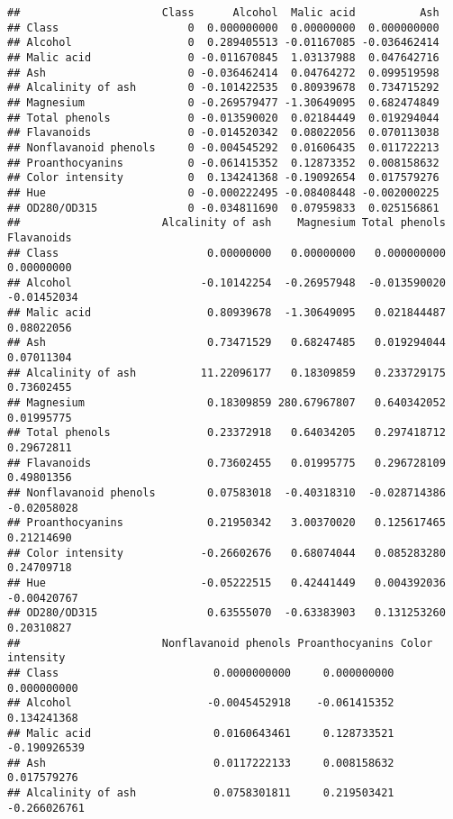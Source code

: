 \documentclass[
]{article}
\begin{document}
\begin{verbatim}
##                      Class      Alcohol  Malic acid          Ash
## Class                    0  0.000000000  0.00000000  0.000000000
## Alcohol                  0  0.289405513 -0.01167085 -0.036462414
## Malic acid               0 -0.011670845  1.03137988  0.047642716
## Ash                      0 -0.036462414  0.04764272  0.099519598
## Alcalinity of ash        0 -0.101422535  0.80939678  0.734715292
## Magnesium                0 -0.269579477 -1.30649095  0.682474849
## Total phenols            0 -0.013590020  0.02184449  0.019294044
## Flavanoids               0 -0.014520342  0.08022056  0.070113038
## Nonflavanoid phenols     0 -0.004545292  0.01606435  0.011722213
## Proanthocyanins          0 -0.061415352  0.12873352  0.008158632
## Color intensity          0  0.134241368 -0.19092654  0.017579276
## Hue                      0 -0.000222495 -0.08408448 -0.002000225
## OD280/OD315              0 -0.034811690  0.07959833  0.025156861
##                      Alcalinity of ash    Magnesium Total phenols  Flavanoids
## Class                       0.00000000   0.00000000   0.000000000  0.00000000
## Alcohol                    -0.10142254  -0.26957948  -0.013590020 -0.01452034
## Malic acid                  0.80939678  -1.30649095   0.021844487  0.08022056
## Ash                         0.73471529   0.68247485   0.019294044  0.07011304
## Alcalinity of ash          11.22096177   0.18309859   0.233729175  0.73602455
## Magnesium                   0.18309859 280.67967807   0.640342052  0.01995775
## Total phenols               0.23372918   0.64034205   0.297418712  0.29672811
## Flavanoids                  0.73602455   0.01995775   0.296728109  0.49801356
## Nonflavanoid phenols        0.07583018  -0.40318310  -0.028714386 -0.02058028
## Proanthocyanins             0.21950342   3.00370020   0.125617465  0.21214690
## Color intensity            -0.26602676   0.68074044   0.085283280  0.24709718
## Hue                        -0.05222515   0.42441449   0.004392036 -0.00420767
## OD280/OD315                 0.63555070  -0.63383903   0.131253260  0.20310827
##                      Nonflavanoid phenols Proanthocyanins Color intensity
## Class                        0.0000000000     0.000000000     0.000000000
## Alcohol                     -0.0045452918    -0.061415352     0.134241368
## Malic acid                   0.0160643461     0.128733521    -0.190926539
## Ash                          0.0117222133     0.008158632     0.017579276
## Alcalinity of ash            0.0758301811     0.219503421    -0.266026761

\end{verbatim}
\end{document}
